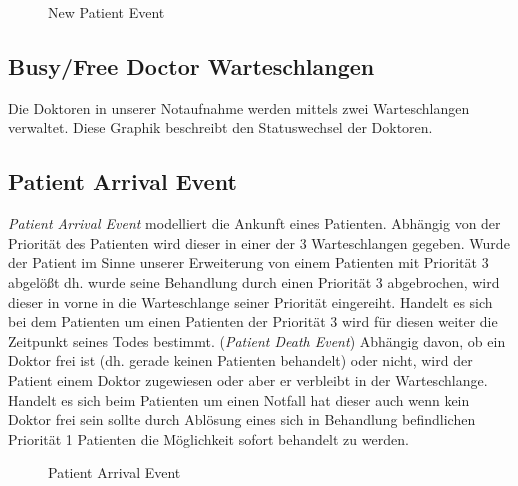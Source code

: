 \documentclass[12pt,fleqn,a4paper]{article}
\begin{document}
\begin{figure}[h]
	\centering
  	\caption{New Patient Event}
\end{figure}

\subsection{Busy/Free Doctor Warteschlangen}
Die Doktoren in unserer Notaufnahme werden mittels zwei Warteschlangen verwaltet. Diese Graphik beschreibt den Statuswechsel der Doktoren.
\begin{center}
\end{center}

\newpage
\subsection{Patient Arrival Event}
\textit{Patient Arrival Event} modelliert die Ankunft eines Patienten.
Abh\"{a}ngig von der Priorit\"{a}t des Patienten wird dieser in einer der 3 Warteschlangen gegeben. Wurde der Patient im Sinne unserer Erweiterung von einem Patienten mit Priorit\"{a}t 3 abgel\"{o}\ss t dh. wurde seine Behandlung durch einen Priorit\"{a}t 3 abgebrochen, wird dieser in vorne in die Warteschlange seiner Priorit\"{a}t eingereiht. Handelt es sich bei dem Patienten um einen Patienten der Priorit\"{a}t 3 wird f\"{u}r diesen weiter die Zeitpunkt seines Todes bestimmt. (\textit{Patient Death Event})
Abh\"{a}ngig davon, ob ein Doktor frei ist (dh. gerade keinen Patienten behandelt) oder nicht, wird der Patient einem Doktor zugewiesen oder aber er verbleibt in der Warteschlange.
Handelt es sich beim Patienten um einen Notfall hat dieser auch wenn kein Doktor frei sein sollte durch Abl\"{o}sung eines sich in Behandlung befindlichen Priorit\"{a}t 1 Patienten die M\"{o}glichkeit sofort behandelt zu werden.


\begin{figure}[h]
	\centering
	\caption{Patient Arrival Event}
\end{figure}


\newpage
\end{document}
